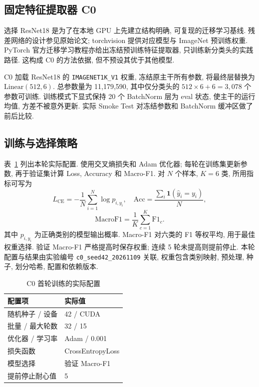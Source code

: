 \documentclass[letterpaper, 10 pt, conference]{ieeeconf}
\begin{document}
\subsection{固定特征提取器 C0}
选择 ResNet18 是为了在本地 GPU 上先建立结构明确, 可复现的迁移学习基线. 残差网络的设计参见原始论文\cite{resnet}; torchvision 提供对应模型与 ImageNet 预训练权重\cite{torchvision-resnet18}. PyTorch 官方迁移学习教程亦给出冻结预训练特征提取器, 只训练新分类头的实践路径\cite{pytorch-transfer}. 这构成 C0 的方法依据, 但不预设其优于其他模型.

C0 加载 ResNet18 的 \texttt{IMAGENET1K\_V1} 权重, 冻结原主干所有参数, 将最终层替换为 $\mathrm{Linear}(512,6)$. 总参数量为 11,179,590, 其中仅分类头的 $512\times6+6=3,078$ 个参数可训练. 训练模式下显式保持 20 个 BatchNorm 层为 eval 状态, 使主干的运行均值, 方差不被意外更新. 实际 Smoke Test 对冻结参数和 BatchNorm 缓冲区做了前后比较.

\subsection{训练与选择策略}
表~\ref{tab:config} 列出本轮实际配置. 使用交叉熵损失和 Adam 优化器; 每轮在训练集更新参数, 再于验证集计算 Loss, Accuracy 和 Macro-F1. 对 $N$ 个样本, $K=6$ 类, 所用指标可写为
\begin{equation}
  L_{\mathrm{CE}}=-\frac{1}{N}\sum_{i=1}^{N}\log p_{i,y_i},\quad
  \mathrm{Acc}=\frac{\sum_i\mathbf{1}(\hat y_i=y_i)}{N},
\end{equation}
\begin{equation}
  \mathrm{MacroF1}=\frac{1}{K}\sum_{c=1}^{K}\mathrm{F1}_{c}.
\end{equation}
其中 $p_{i,y_i}$ 为正确类别的模型输出概率. Macro-F1 对六类的 F1 等权平均, 用于最佳权重选择. 验证 Macro-F1 严格提高时保存权重; 连续 5 轮未提高则提前停止. 本轮配置与结果由实验编号 \texttt{c0\_seed42\_20261109} 关联, 权重包含类别映射, 预处理, 种子, 划分哈希, 配置和依赖版本.

\begin{table}[t]
  \centering
  \caption{C0 首轮训练的实际配置}
  \label{tab:config}
  \begin{tabular}{ll}
    \toprule
    配置项 & 实际值 \\
    \midrule
    随机种子 / 设备 & 42 / CUDA \\
    批量 / 最大轮数 & 32 / 15 \\
    优化器 / 学习率 & Adam / 0.001 \\
    损失函数 & CrossEntropyLoss \\
    模型选择 & 验证 Macro-F1 \\
    提前停止耐心值 & 5 \\
    \bottomrule
  \end{tabular}
\end{table}
\end{document}
